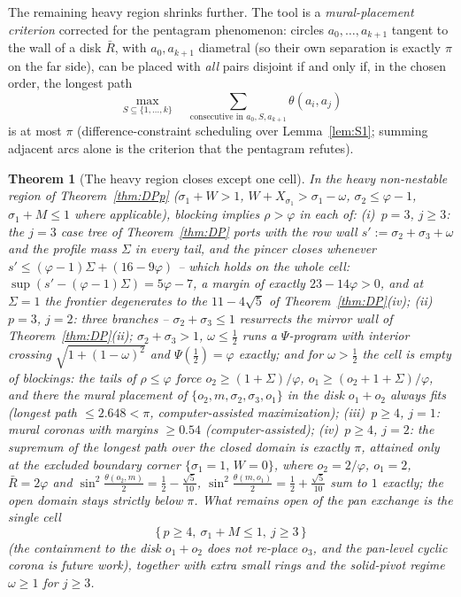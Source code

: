 \documentclass[11pt]{article}
\newtheorem{theorem}{Theorem}
\theoremstyle{definition}
\begin{document}
The remaining heavy region shrinks further. The tool is a
\emph{mural-placement criterion} corrected for the pentagram
phenomenon: circles $a_0,\dots,a_{k+1}$ tangent to the wall of a disk
$\bar R$, with $a_0,a_{k+1}$ diametral (so their own separation is
exactly $\pi$ on the far side), can be placed with \emph{all} pairs
disjoint if and only if, in the chosen order, the longest path
\[
\max_{S\subseteq\{1,\dots,k\}}\quad
\sum_{\text{consecutive in }a_0,S,a_{k+1}}\theta(a_i,a_j)
\]
is at most $\pi$ (difference-constraint scheduling
over Lemma~\ref{lem:S1}; summing adjacent arcs alone is the criterion
that the pentagram refutes).

\begin{theorem}[The heavy region closes except one cell]\label{thm:DPr}
In the heavy non-nestable region of Theorem~\ref{thm:DPp}
($\sigma_1+W>1$, $W+X_{\sigma_1}>\sigma_1-\omega$,
$\sigma_2\le\varphi-1$, $\sigma_1+M\le1$ where applicable), blocking
implies $\rho>\varphi$ in each of: (i)~$p=3$, $j\ge3$: the $j=3$ case
tree of Theorem~\ref{thm:DP} ports with the row wall
$s':=\sigma_2+\sigma_3+\omega$ and the profile mass $\Sigma$ in every
tail, and the pincer closes whenever
$s'\le(\varphi-1)\Sigma+(16-9\varphi)$ -- which holds on the whole
cell: $\sup(s'-(\varphi-1)\Sigma)=5\varphi-7$, a margin of exactly
$23-14\varphi>0$, and at $\Sigma=1$ the frontier degenerates to the
$11-4\sqrt5$ of Theorem~\ref{thm:DP}(iv); (ii)~$p=3$, $j=2$: three
branches -- $\sigma_2+\sigma_3\le1$ resurrects the mirror wall of
Theorem~\ref{thm:DP}(ii); $\sigma_2+\sigma_3>1$, $\omega\le\tfrac12$
runs a $\Psi$-program with interior crossing
$\sqrt{1+(1-\omega)^2}$ and $\Psi(\tfrac12)=\varphi$ exactly; and for
$\omega>\tfrac12$ the cell is \emph{empty of blockings}: the tails of
$\rho\le\varphi$ force $o_2\ge(1+\Sigma)/\varphi$,
$o_1\ge(o_2+1+\Sigma)/\varphi$, and there the mural placement of
$\{o_2,m,\sigma_2,\sigma_3,o_1\}$ in the disk $o_1+o_2$ always fits
(longest path $\le2.648<\pi$, computer-assisted maximization);
(iii)~$p\ge4$, $j=1$: mural coronas with margins $\ge0.54$
(computer-assisted); (iv)~$p\ge4$, $j=2$: the supremum of the longest
path over the closed domain is exactly $\pi$, attained only at the
excluded boundary corner $\{\sigma_1=1,\,W=0\}$, where $o_2=2/\varphi$,
$o_1=2$, $\bar R=2\varphi$ and
$\sin^2\tfrac{\theta(o_2,m)}2=\tfrac12-\tfrac{\sqrt5}{10}$,
$\sin^2\tfrac{\theta(m,o_1)}2=\tfrac12+\tfrac{\sqrt5}{10}$ sum to $1$
exactly; the open domain stays strictly below $\pi$. What remains open
of the pan exchange is the single cell
\[
\{\,p\ge4,\ \sigma_1+M\le1,\ j\ge3\,\}
\]
(the containment to the disk $o_1+o_2$ does not re-place $o_3$, and
the pan-level cyclic corona is future work), together with extra small
rings and the solid-pivot regime $\omega\ge1$ for $j\ge3$.
\end{theorem}
\end{document}
